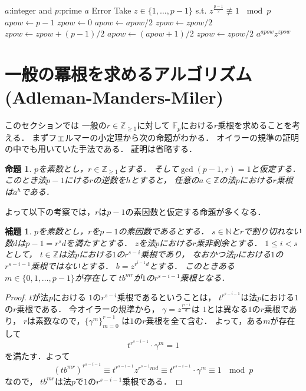 \documentclass[leqno]{jsarticle}
\newtheorem{prop}[thm]{命題}
\newtheorem{lem}[thm]{補題}
\newcommand{\nn}{\mathbb{N}}
\newcommand{\zz}{\mathbb{Z}}
\begin{document}
\begin{algorithm}
\caption{Solving $x^2\equiv a\ \mod p$}
\begin{algorithmic}
\REQUIRE $a$:integer and $p$:prime 
\RETURN $a$
\ENDIF
{}
\RETURN Error
\ENDIF
\STATE Take $z\in \{1, \dots, p-1\}$ s.t. $z^{\frac{p-1}{2}}\not \equiv 1 \ \mod p$
\STATE  $apow\leftarrow p-1$
\STATE  $zpow\leftarrow 0$
\STATE $apow\leftarrow apow/2$
\STATE $zpow\leftarrow zpow/2$
\STATE $zpow\leftarrow zpow + (p-1)/2$
\ENDIF
\ENDWHILE
\STATE $apow\leftarrow (apow+1)/2$
\STATE  $zpow \leftarrow zpow/2$
\RETURN $a^{apow}z^{zpow}$
\end{algorithmic}
\end{algorithm}





\section{一般の冪根を求めるアルゴリズム(Adleman-Manders-Miler)}

このセクションでは
一般の$r\in \zz_{\ge 1}$に対して
$\mathbb{F}_p$における$r$乗根を求めることを考える．
まずフェルマーの小定理から次の命題がわかる．
オイラーの規準の証明の中でも用いていた手法である．
証明は省略する．
\begin{prop}
$p$を素数とし，$r\in \zz_{\ge 1}$とする．
そして$\gcd(p-1, r)=1$と仮定する．
このとき法$p-1$にける$r$の逆数を$h$とすると，
任意の$a\in \zz$の法$p$における$r$乗根
は$a^{h}$である．
\end{prop}

よって以下の考察では，$r$は$p-1$の素因数と仮定する命題が多くなる．



\begin{lem}\label{lem:hodair}
$p$を素数とし，$r$を$p-1$の素因数であるとする．
$s\in \nn$と$r$で割り切れない数$d$は$p-1=r^{s}d$を満たすとする．
$z$を法$p$における$r$乗非剰余とする．
$ 1\le i< s$として，
$t\in \zz$は法$p$における$1$の$r^{s-i}$乗根であり，
なおかつ法$p$における$1$の$r^{s-i-1}$乗根ではないとする．
$b=z^{r^{i-1}d}$とする．
このときある$m\in \{0, 1, \dots, p-1\}$が存在して
$tb^{mr}$が$1$の$r^{s-i-1}$乗根となる．
\end{lem}
\begin{proof}
$t$が法$p$における
$1$の$r^{s-i}$乗根であるということは，
$t^{r^{s-i-1}}$は法$p$における$1$の$r$乗根である．
今オイラーの規準から，
$\gamma=z^{\frac{r^{s-1}}d}$は
$1$とは異なる$1$の$r$乗根であり，
$r$は素数なので，$\{\gamma^m\}_{m=0}^{r-1}$
は$1$の$r$乗根を全て含む．
よって，ある$m$が存在して
\[
t^{r^{s-i-1}}\cdot \gamma^m=1
\]
を満たす．よって
\[
(tb^{mr})^{r^{s-i-1}}\equiv 
t^{r^{s-i-1}}z^{r^{s-1}md}
\equiv
t^{r^{s-i-1}}\cdot \gamma^{m}
\equiv 1\ \mod p
\]
なので，
$tb^{mr}$は法$p$で$1$の$r^{s-i-1}$乗根である．
\end{proof}
\end{document}

